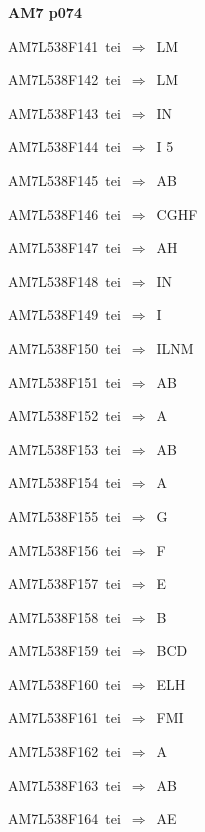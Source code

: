 \par\vfill\eject
{\bf\hfill AM7 p074\hfill\hbox{}}\par\bigskip
{\sixrm AM7L538F141\ {\sixit tei}\ }$\Rightarrow$\ LM\par\smallskip
{\sixrm AM7L538F142\ {\sixit tei}\ }$\Rightarrow$\ LM\par\smallskip
{\sixrm AM7L538F143\ {\sixit tei}\ }$\Rightarrow$\ IN\par\smallskip
{\sixrm AM7L538F144\ {\sixit tei}\ }$\Rightarrow$\ I 5\par\smallskip
{\sixrm AM7L538F145\ {\sixit tei}\ }$\Rightarrow$\ AB\par\smallskip
{\sixrm AM7L538F146\ {\sixit tei}\ }$\Rightarrow$\ CGHF\par\smallskip
{\sixrm AM7L538F147\ {\sixit tei}\ }$\Rightarrow$\ AH\par\smallskip
{\sixrm AM7L538F148\ {\sixit tei}\ }$\Rightarrow$\ IN\par\smallskip
{\sixrm AM7L538F149\ {\sixit tei}\ }$\Rightarrow$\ I\par\smallskip
{\sixrm AM7L538F150\ {\sixit tei}\ }$\Rightarrow$\ ILNM\par\smallskip
{\sixrm AM7L538F151\ {\sixit tei}\ }$\Rightarrow$\ AB\par\smallskip
{\sixrm AM7L538F152\ {\sixit tei}\ }$\Rightarrow$\ {\tenit A}\par\smallskip
{\sixrm AM7L538F153\ {\sixit tei}\ }$\Rightarrow$\ AB\par\smallskip
{\sixrm AM7L538F154\ {\sixit tei}\ }$\Rightarrow$\ A\par\smallskip
{\sixrm AM7L538F155\ {\sixit tei}\ }$\Rightarrow$\ G\par\smallskip
{\sixrm AM7L538F156\ {\sixit tei}\ }$\Rightarrow$\ F\par\smallskip
{\sixrm AM7L538F157\ {\sixit tei}\ }$\Rightarrow$\ E\par\smallskip
{\sixrm AM7L538F158\ {\sixit tei}\ }$\Rightarrow$\ B\par\smallskip
{\sixrm AM7L538F159\ {\sixit tei}\ }$\Rightarrow$\ BCD\par\smallskip
{\sixrm AM7L538F160\ {\sixit tei}\ }$\Rightarrow$\ ELH\par\smallskip
{\sixrm AM7L538F161\ {\sixit tei}\ }$\Rightarrow$\ FMI\par\smallskip
{\sixrm AM7L538F162\ {\sixit tei}\ }$\Rightarrow$\ A\par\smallskip
{\sixrm AM7L538F163\ {\sixit tei}\ }$\Rightarrow$\ AB\par\smallskip
{\sixrm AM7L538F164\ {\sixit tei}\ }$\Rightarrow$\ AE\par\smallskip

